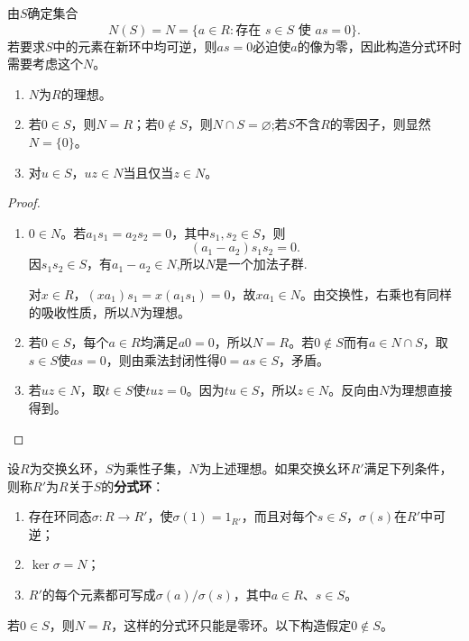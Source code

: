 由$S$确定集合
\[
N(S)=N=\{a\in R:\text{存在 }s\in S\text{ 使 }as=0\}.
\]
若要求$S$中的元素在新环中均可逆，则$as=0$必迫使$a$的像为零，因此构造分式环时需要考虑这个$N$。

\begin{lemma}
\begin{enumerate}
\item $N$为$R$的理想。
\item 若$0\in S$，则$N=R$；若$0\notin S$，则$N\cap S=\varnothing$;若$S$不含$R$的零因子，则显然$N=\{0\}$。
\item 对$u\in S$，$uz\in N$当且仅当$z\in N$。
\end{enumerate}
\end{lemma}
\begin{proof}
\begin{enumerate}
\item $0\in N$。若$a_1s_1=a_2s_2=0$，其中$s_1,s_2\in S$，则
\[
(a_1-a_2)s_1s_2=0.
\]
因$s_1s_2\in S$，有$a_1-a_2\in N$,所以$N$是一个加法子群.

对$x\in R$，$(xa_1)s_1=x(a_1s_1)=0$，故$xa_1\in N$。由交换性，右乘也有同样的吸收性质，所以$N$为理想。
\item 若$0\in S$，每个$a\in R$均满足$a0=0$，所以$N=R$。若$0\notin S$而有$a\in N\cap S$，取$s\in S$使$as=0$，则由乘法封闭性得$0=as\in S$，矛盾。
\item 若$uz\in N$，取$t\in S$使$tuz=0$。因为$tu\in S$，所以$z\in N$。反向由$N$为理想直接得到。
\end{enumerate}
\end{proof}

\begin{definition}\label{p2:concept:c3-fraction-ring}
设$R$为交换幺环，$S$为乘性子集，$N$为上述理想。如果交换幺环$R'$满足下列条件，则称$R'$为$R$关于$S$的\textbf{分式环}：
\begin{enumerate}
\item 存在环同态$\sigma:R\to R'$，使$\sigma(1)=1_{R'}$，而且对每个$s\in S$，$\sigma(s)$在$R'$中可逆；
\item $\ker\sigma=N$；
\item $R'$的每个元素都可写成$\sigma(a)/\sigma(s)$，其中$a\in R$、$s\in S$。
\end{enumerate}
\end{definition}

若$0\in S$，则$N=R$，这样的分式环只能是零环。以下构造假定$0\notin S$。

